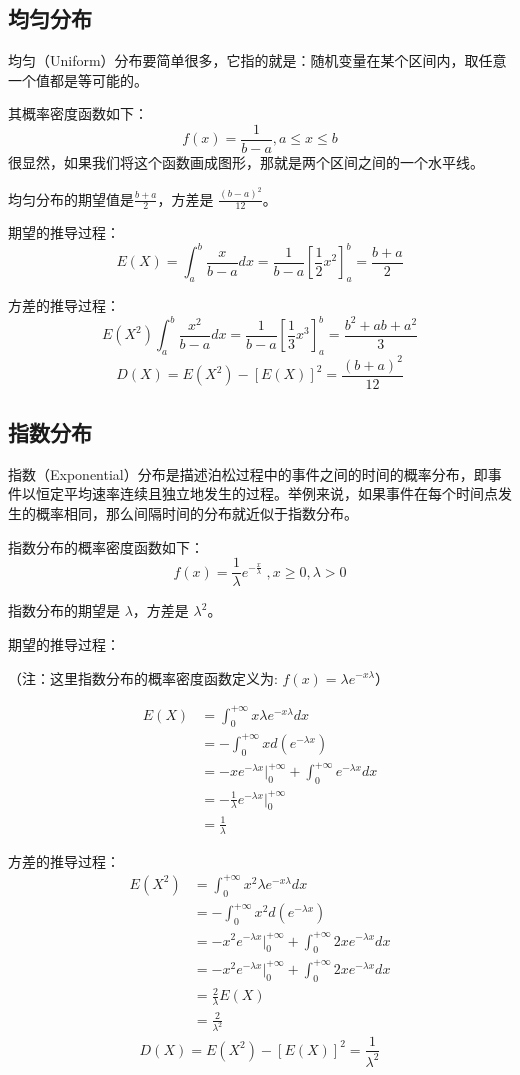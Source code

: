 \documentclass[12pt]{article}
\begin{document}
\subsection{均匀分布}
均匀（Uniform）分布要简单很多，它指的就是：随机变量在某个区间内，取任意一个值都是等可能的。

其概率密度函数如下：
$$
f(x) = \frac{1}{b-a} , a \le x \le b
$$
很显然，如果我们将这个函数画成图形，那就是两个区间之间的一个水平线。

均匀分布的期望值是$\frac{b+a}{2}$，方差是 $\frac{(b-a)^2}{12}$。

期望的推导过程：
$$
E(X) = \int_a^b\frac{x}{b-a}dx = \frac{1}{b-a}[\frac{1}{2}x^2]_a^b = \frac{b+a}{2}
$$

方差的推导过程：
$$
E(X^2) \int_a^b\frac{x^2}{b-a}dx = \frac{1}{b-a}[\frac{1}{3}x^3]_a^b = \frac{b^2+ab+a^2}{3}
$$
$$
D(X) = E(X^2) - [E(X)]^2 = \frac{(b+a)^2}{12}
$$

\subsection{指数分布}
指数（Exponential）分布是描述泊松过程中的事件之间的时间的概率分布，即事件以恒定平均速率连续且独立地发生的过程。举例来说，如果事件在每个时间点发生的概率相同，那么间隔时间的分布就近似于指数分布。

指数分布的概率密度函数如下：
$$
f(x) = \frac{1}{\lambda}e^{-\frac{x}{\lambda}} \; ,x \ge 0, \lambda > 0
$$

指数分布的期望是 $\lambda$，方差是 $\lambda^2$。

期望的推导过程：

（注：这里指数分布的概率密度函数定义为: $f(x) = {\lambda}e^{-{x}{\lambda}}$）

\begin{align*}
E(X) &= \int_0^{+\infty}x{\lambda}e^{-{x}{\lambda}}dx \\
&= -\int_0^{+\infty}xd(e^{-\lambda x}) \\
&= -xe^{-\lambda x}\big|_0^{+\infty} + \int_0^{+\infty} e^{-\lambda x}dx \\
&= -\frac{1}{\lambda}e^{-\lambda x}\big|_0^{+\infty} \\
&= \frac{1}{\lambda}
\end{align*}

方差的推导过程：
\begin{align*}
E(X^2) &= \int_0^{+\infty}x^2{\lambda}e^{-{x}{\lambda}}dx \\
&= -\int_0^{+\infty}x^2d(e^{-\lambda x}) \\
&= -x^2e^{-\lambda x}\big|_0^{+\infty} + \int_0^{+\infty}2x e^{-\lambda x}dx \\
&= -x^2e^{-\lambda x}\big|_0^{+\infty} + \int_0^{+\infty}2x e^{-\lambda x}dx \\
&= \frac{2}{\lambda} E(X) \\
&= \frac{2}{\lambda^2}
\end{align*}
$$
D(X) = E(X^2) - [E(X)]^2 = \frac{1}{\lambda^2}
$$
\end{document}
